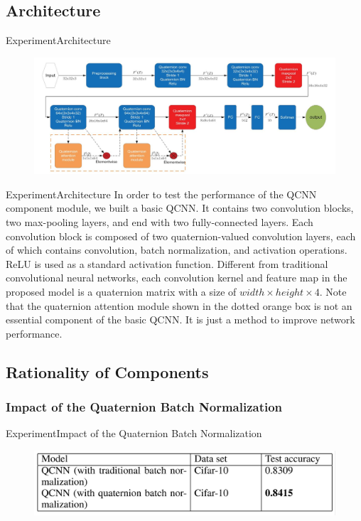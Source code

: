 \documentclass{beamer}
\begin{document}
\subsection{Architecture}
\begin{frame}{Experiment}{Architecture}
    \begin{figure}[H]
        \centering
        \includegraphics[width=\textwidth]{img/5.jpg}
    \end{figure}
\end{frame}

\begin{frame}{Experiment}{Architecture}
In order to test the performance of the QCNN component
module, we built a basic QCNN. It contains two convolution blocks, two max-pooling layers, and end with two
fully-connected layers. Each convolution block is composed
of two quaternion-valued convolution layers, each of which
contains convolution, batch normalization, and activation
operations. ReLU is used as a standard activation function. Different from traditional convolutional
neural networks, each convolution kernel and feature map
in the proposed model is a quaternion matrix with a size of
$width\times height \times4$. Note that the quaternion attention module
shown in the dotted orange box is not an essential component
of the basic QCNN. It is just a method to improve network
performance.
\end{frame}

\subsection{Rationality of Components}
\subsubsection{Impact of the Quaternion Batch Normalization}
\begin{frame}{Experiment}{Impact of the Quaternion Batch Normalization}
    \begin{figure}[H]
        \centering
        \includegraphics[width=\textwidth]{img/6.jpg}
    \end{figure}
\end{frame}
\end{document}
